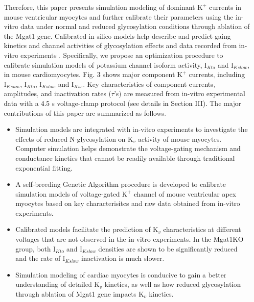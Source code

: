 \documentclass[journal]{IEEEtran}
\begin{document}
Therefore, this paper presents simulation modeling of dominant $\text{K}^{+}$ currents in mouse ventricular myocytes and further calibrate their parameters using the in-vitro data under normal and reduced glycosylation conditions through ablation of the Mgat1 gene. Calibrated in-silico models help describe and predict gaing kinetics and channel activities of glycosylation effects and data recorded from in-vitro experiments \cite{ednie2019reduced}. Specifically, we propose an optimization procedure to calibrate simulation models of potassium channel isoform activity, $\text{I}_{Kto}$ and $\text{I}_{Kslow}$, in mouse cardiomyocytes.  Fig. 3 shows  major component $\text{K}^{+}$ currents, including $\text{I}_{Ksum}$, $\text{I}_{Kto}$, $\text{I}_{Kslow}$ and $\text{I}_{Kss}$. Key characteristics of component currents, amplitudes, and inactivation rates ($\tau$'s) are measured from in-vitro experimental data with a 4.5 s voltage-clamp protocol (see details in Section III). The major contributions of this paper are summarized as follows.
\begin{itemize}
    \item Simulation models are integrated with in-vitro experiments to investigate the effects of reduced N-glycosylation on $\text{K}_{v}$ activity of mouse myocytes. Computer simulation helps demonstrate the voltage-gating mechanism and conductance kinetics that cannot be readily available through traditional exponential fitting. 
    \item A self-breeding Genetic Algorithm procedure is developed to calibrate simulation models of voltage-gated $\text{K}^{+}$ channel of mouse ventricular apex myocytes based on key characterisitcs and raw data obtained from in-vitro experiments.
    \item Calibrated models facilitate the prediction of $\text{K}_{v}$ characteristics at different voltages that are not observed in the in-vitro experiments. In the Mgat1KO group, both $\text{I}_{Kto}$ and $\text{I}_{Kslow}$ densities are shown to be significantly reduced and the rate of $\text{I}_{Kslow}$ inactivation is much slower.
    \item Simulation modeling of cardiac myocytes is conducive to gain a better understanding of detailed $\text{K}_{v}$ kinetics, as well as how reduced glycosylation through ablation of Mgat1 gene impacts $\text{K}_{v}$ kinetics.
\end{itemize}

\end{document}
